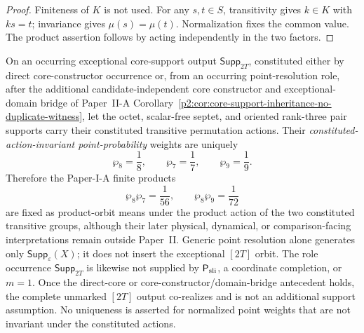 \documentclass[11pt,a4paper]{article}
\begin{document}
\begin{proof}
Finiteness of \(K\) is not used.  For any \(s,t\in S\), transitivity gives
\(k\in K\) with \(ks=t\);
invariance gives \(\mu(s)=\mu(t)\).  Normalization fixes the common value.
The product assertion follows by acting independently in the two factors.
\end{proof}

\begin{corollary}
\label{p2:cor:paper1-octet-descendant-weight-closure}
On an occurring exceptional core-support output
\(\mathsf{Supp}_{2T}\), constituted either by direct core-constructor
occurrence or, from an occurring point-resolution role, after the additional
candidate-independent core constructor and exceptional-domain bridge of
Paper~II-A Corollary~\ref{p2:cor:core-support-inheritance-no-duplicate-witness},
let the octet, scalar-free septet, and oriented rank-three pair supports carry
their constituted transitive permutation actions.  Their \emph{constituted-action-invariant point-probability}
weights are uniquely
\[
    \wp_8=\frac18,
    \qquad
    \wp_7=\frac17,
    \qquad
    \wp_9=\frac19.
\]
Therefore the Paper-I-A finite products
\[
    \wp_8\wp_7=\frac1{56},
    \qquad
    \wp_8\wp_9=\frac1{72}
\]
are fixed as product-orbit means under the product action of the two
constituted transitive groups, although their later
physical, dynamical, or comparison-facing interpretations remain outside
Paper~II.  Generic point resolution alone generates only
\(\mathsf{Supp}_{\varepsilon}(X)\); it does not insert the exceptional
\([2T]\) orbit.  The role occurrence \(\mathsf{Supp}_{2T}\) is likewise not
supplied by \(\mathsf P_{\rm sli}\), a coordinate completion, or \(m=1\).
Once the direct-core or core-constructor/domain-bridge antecedent holds, the
complete unmarked \([2T]\) output co-realizes and is not an additional support
assumption.
No uniqueness is asserted for normalized point weights that are not invariant
under the constituted actions.
\end{corollary}
\end{document}
